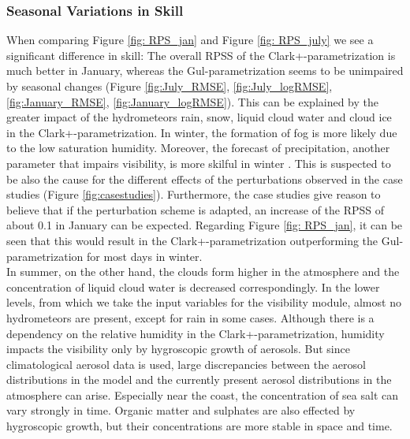 \subsubsection{Seasonal Variations in Skill}
When comparing Figure \ref{fig: RPS_jan} and Figure \ref{fig: RPS_july} we see a significant difference in skill: The overall RPSS of the Clark+-parametrization is much better in January, whereas the Gul-parametrization seems to be unimpaired by seasonal changes (Figure \ref{fig:July_RMSE}, \ref{fig:July_logRMSE}, \ref{fig:January_RMSE}, \ref{fig:January_logRMSE}). This can be explained by the greater impact of the hydrometeors rain, snow, liquid cloud water and cloud ice in the Clark+-parametrization. In winter, the formation of fog is more likely due to the low saturation humidity.  Moreover, the forecast of precipitation, another parameter that impairs visibility, is more skilful in winter \cite{kidd2012}. This is suspected to be also the cause for the different effects of the perturbations observed in the case studies (Figure \ref{fig:casestudies}). Furthermore, the case studies give reason to believe that if the perturbation scheme is adapted, an increase of the RPSS of about 0.1 in January can be expected. Regarding Figure \ref{fig: RPS_jan}, it can be seen that this would result in the Clark+-parametrization outperforming the Gul-parametrization for most days in winter.\\ 
In summer, on the other hand, the clouds form higher in the atmosphere and the concentration of liquid cloud water is decreased correspondingly. In the lower levels, from which we take the input variables for the visibility module, almost no hydrometeors are present, except for rain in some cases. Although there is a dependency on the relative humidity in the Clark+-parametrization, humidity impacts the visibility only by hygroscopic growth of aerosols. But since climatological aerosol data is used, large discrepancies between the aerosol distributions in the model and the currently present aerosol distributions in the atmosphere can arise. Especially near the coast, the concentration of sea salt can vary strongly in time. Organic matter and sulphates are also effected by hygroscopic growth, but their concentrations are more stable in space and time. 
